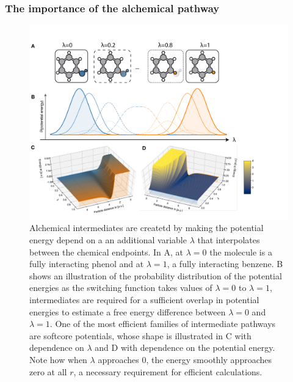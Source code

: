 \documentclass[9pt,bestpractices]{livecoms}
\begin{document}
\subsubsection{The importance of the alchemical pathway\label{sec:important_path}}

\begin{figure}
    \includegraphics[width=0.95\linewidth]{figures/fig7_what_is_lam/Figure.pdf}
    \caption{Alchemical intermediates are createtd by making the potential energy depend on a an additional variable $\lambda$ that interpolates between the chemical endpoints. In A, at $\lambda=0$ the molecule is a fully interacting phenol and at $\lambda=1$,  a fully interacting benzene.  B shows an illustration of the probability distribution of the potential energies as the switching function takes values of $\lambda=0$ to $\lambda=1$, intermediates are required for a sufficient overlap in potential energies to estimate a free energy difference between $\lambda=0$ and $\lambda=1$.
    One of the most efficient families of intermediate pathways  are softcore potentials, whose shape is illustrated in C with dependence on $\lambda$ and D with dependence on the potential energy. Note how when $\lambda$ approaches 0, the energy smoothly approaches zero at all $r$, a necessary requirement for efficient calculations.  }
    \label{fig:fig_what_is_lambda}
\end{figure}
\end{document}
